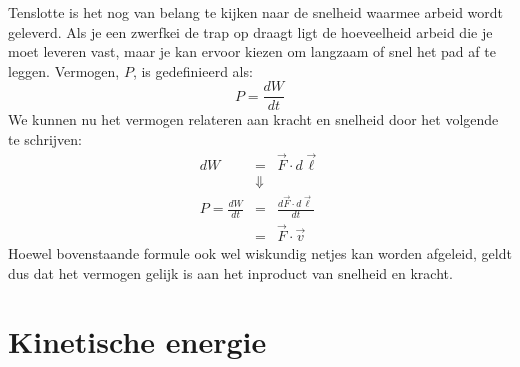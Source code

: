 Tenslotte is het nog van belang te kijken naar de snelheid waarmee arbeid wordt
geleverd. Als je een zwerfkei de trap op draagt ligt de hoeveelheid arbeid die  je moet
leveren vast, maar je kan ervoor kiezen om langzaam of snel het pad af te leggen. 
Vermogen, $P$, is gedefinieerd als:
\begin{equation}\label{eq:vermogen1}
P = \frac{dW}{dt} 
\end{equation}
We kunnen nu het vermogen relateren aan kracht en snelheid door het volgende 
te schrijven:
\begin{eqnarray}
dW & =  &  \vec{F}\cdot d\vec{\ell} \\
       & \Downarrow & \\
P=\frac{dW}{dt}   & = & \frac{d \vec{F}\cdot d\vec{\ell}}{dt}\\
      & = & \vec{F}\cdot\vec{v}\label{eq:vermogen2}
\end{eqnarray}
Hoewel bovenstaande formule ook wel wiskundig netjes kan worden afgeleid, geldt
dus dat het vermogen gelijk is aan het inproduct van snelheid en kracht.    

\section{Kinetische energie}

